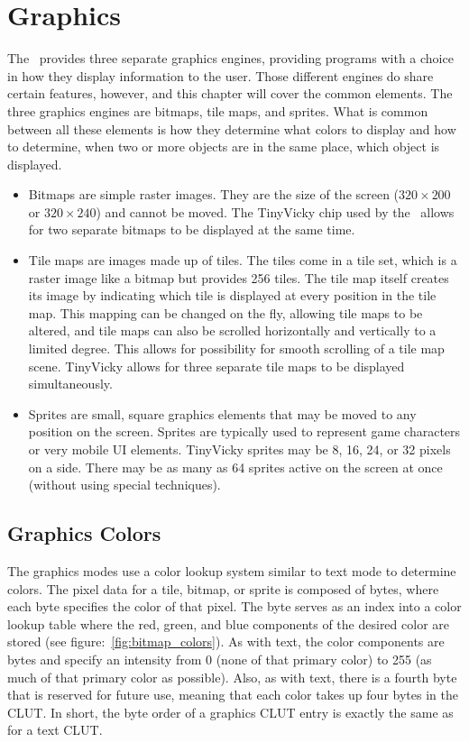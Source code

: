 \chapter{Graphics}

The \jr\ provides three separate graphics engines, providing programs with a choice in how they display information to the user. Those different engines do share certain features, however, and this chapter will cover the common elements. The three graphics engines are bitmaps, tile maps, and sprites. What is common between all these elements is how they determine what colors to display and how to determine, when two or more objects are in the same place, which object is displayed.

\begin{itemize}
    \item Bitmaps are simple raster images. They are the size of the screen ($320 \times 200$ or $320 \times 240$) and cannot be moved. The TinyVicky chip used by the \jr\ allows for two separate bitmaps to be displayed at the same time.

    \item Tile maps are images made up of tiles. The tiles come in a tile set, which is a raster image like a bitmap but provides 256 tiles. The tile map itself creates its image by indicating which tile is displayed at every position in the tile map. This mapping can be changed on the fly, allowing tile maps to be altered, and tile maps can also be scrolled horizontally and vertically to a limited degree. This allows for possibility for smooth scrolling of a tile map scene. TinyVicky allows for three separate tile maps to be displayed simultaneously.

    \item Sprites are small, square graphics elements that may be moved to any position on the screen. Sprites are typically used to represent game characters or very mobile UI elements. TinyVicky sprites may be 8, 16, 24, or 32 pixels on a side. There may be as many as 64 sprites active on the screen at once (without using special techniques).
\end{itemize}

\section{Graphics Colors}

The graphics modes use a color lookup system similar to text mode to determine colors. The pixel data for a tile, bitmap, or sprite is composed of bytes, where each byte specifies the color of that pixel. The byte serves as an index into a color lookup table where the red, green, and blue components of the desired color are stored (see figure:~\ref{fig:bitmap_colors}). As with text, the color components are bytes and specify an intensity from 0 (none of that primary color) to 255 (as much of that primary color as possible). Also, as with text, there is a fourth byte that is reserved for future use, meaning that each color takes up four bytes in the CLUT. In short, the byte order of a graphics CLUT entry is exactly the same as for a text CLUT.

